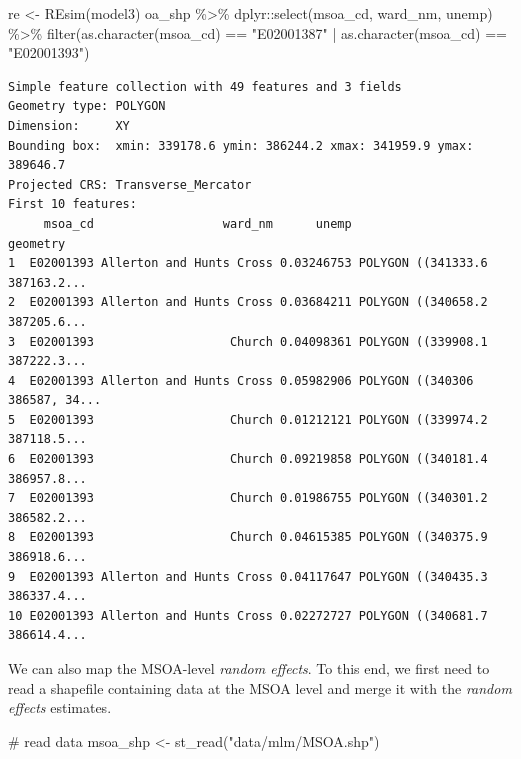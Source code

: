 \documentclass[
  letterpaper,
  DIV=11,
  numbers=noendperiod,
  oneside]{scrreprt}
\newenvironment{Shaded}{\begin{snugshade}}{\end{snugshade}}
\newcommand{\CommentTok}[1]{\textcolor[rgb]{0.37,0.37,0.37}{#1}}
\newcommand{\FunctionTok}[1]{\textcolor[rgb]{0.28,0.35,0.67}{#1}}
\newcommand{\NormalTok}[1]{\textcolor[rgb]{0.00,0.23,0.31}{#1}}
\newcommand{\OtherTok}[1]{\textcolor[rgb]{0.00,0.23,0.31}{#1}}
\newcommand{\SpecialCharTok}[1]{\textcolor[rgb]{0.37,0.37,0.37}{#1}}
\newcommand{\StringTok}[1]{\textcolor[rgb]{0.13,0.47,0.30}{#1}}
\begin{document}
\begin{Shaded}
\begin{Highlighting}[]
\NormalTok{re }\OtherTok{\textless{}{-}} \FunctionTok{REsim}\NormalTok{(model3)}
\NormalTok{oa\_shp }\SpecialCharTok{\%\textgreater{}\%}\NormalTok{ dplyr}\SpecialCharTok{::}\FunctionTok{select}\NormalTok{(msoa\_cd, ward\_nm, unemp) }\SpecialCharTok{\%\textgreater{}\%}
    \FunctionTok{filter}\NormalTok{(}\FunctionTok{as.character}\NormalTok{(msoa\_cd) }\SpecialCharTok{==} \StringTok{"E02001387"} \SpecialCharTok{|} \FunctionTok{as.character}\NormalTok{(msoa\_cd) }\SpecialCharTok{==} \StringTok{"E02001393"}\NormalTok{)}
\end{Highlighting}
\end{Shaded}

\begin{verbatim}
Simple feature collection with 49 features and 3 fields
Geometry type: POLYGON
Dimension:     XY
Bounding box:  xmin: 339178.6 ymin: 386244.2 xmax: 341959.9 ymax: 389646.7
Projected CRS: Transverse_Mercator
First 10 features:
     msoa_cd                  ward_nm      unemp                       geometry
1  E02001393 Allerton and Hunts Cross 0.03246753 POLYGON ((341333.6 387163.2...
2  E02001393 Allerton and Hunts Cross 0.03684211 POLYGON ((340658.2 387205.6...
3  E02001393                   Church 0.04098361 POLYGON ((339908.1 387222.3...
4  E02001393 Allerton and Hunts Cross 0.05982906 POLYGON ((340306 386587, 34...
5  E02001393                   Church 0.01212121 POLYGON ((339974.2 387118.5...
6  E02001393                   Church 0.09219858 POLYGON ((340181.4 386957.8...
7  E02001393                   Church 0.01986755 POLYGON ((340301.2 386582.2...
8  E02001393                   Church 0.04615385 POLYGON ((340375.9 386918.6...
9  E02001393 Allerton and Hunts Cross 0.04117647 POLYGON ((340435.3 386337.4...
10 E02001393 Allerton and Hunts Cross 0.02272727 POLYGON ((340681.7 386614.4...
\end{verbatim}

We can also map the MSOA-level \emph{random effects}. To this end, we
first need to read a shapefile containing data at the MSOA level and
merge it with the \emph{random effects} estimates.

\begin{Shaded}
\begin{Highlighting}[]
\CommentTok{\# read data}
\NormalTok{msoa\_shp }\OtherTok{\textless{}{-}} \FunctionTok{st\_read}\NormalTok{(}\StringTok{"data/mlm/MSOA.shp"}\NormalTok{)}
\end{Highlighting}
\end{Shaded}
\end{document}
